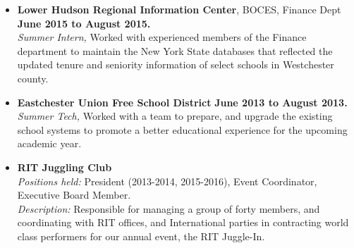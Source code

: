 \documentclass[10pt]{article}
\begin{document}
\begin{itemize}[topsep=.5ex, itemsep=.25ex, partopsep=0ex, parsep=.5ex]
	\item[]{{\bf Lower Hudson Regional Information Center}, BOCES, Finance Dept \hfill {\bf June 2015 to August 2015.}}\\
	{\it Summer Intern,}
	Worked with experienced members of the Finance department to maintain the New York
	State databases that reflected the updated tenure and seniority information of select schools in Westchester county.
	\item[]{{\bf Eastchester Union Free School District} \hfill { \bf June 2013 to August 2013.}}\\
		{\it Summer Tech,}
		{Worked with a team to prepare, and upgrade the existing school systems to promote a better educational experience for the upcoming academic year.}
\end{itemize}
\vspace{1ex}
\begin{itemize} [topsep=1ex, itemsep=.25ex, partopsep=0ex, parsep=1ex]
	\item[] {\bf RIT Juggling Club}\\
	{\it Positions held:}  President (2013-2014, 2015-2016), Event Coordinator, Executive Board Member.\\
	{\it Description:} Responsible for managing a group of forty members, and coordinating with RIT offices, and International parties in contracting world class performers for our annual event, the RIT Juggle-In.
\end{itemize}
\end{document}
